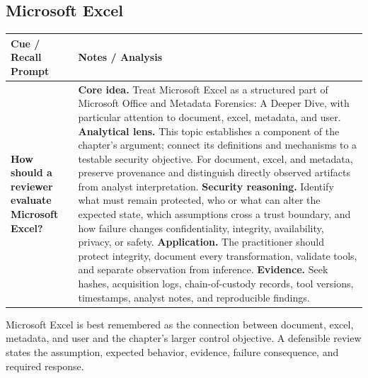 \documentclass[11pt]{article}
\newcommand{\CornellHeader}{%
\rowcolor{Navy}\color{white}\bfseries Cue / Recall Prompt & \color{white}\bfseries Notes / Analysis\\\hline}
\newcommand{\CornellRow}[2]{%
\cellcolor{CueGray}\RaggedRight\textbf{#1} & \RaggedRight #2\\\hline}
\begin{document}
\subsection*{Microsoft Excel}
\begin{longtable}{>{\RaggedRight\arraybackslash}p{}|>{\RaggedRight\arraybackslash}p{}}
\CornellHeader
\CornellRow{How should a reviewer evaluate Microsoft Excel?}{\textbf{Core idea.} Treat Microsoft Excel as a structured part of Microsoft Office and Metadata Forensics: A Deeper Dive, with particular attention to document, excel, metadata, and user. \textbf{Analytical lens.} This topic establishes a component of the chapter's argument; connect its definitions and mechanisms to a testable security objective. For document, excel, and metadata, preserve provenance and distinguish directly observed artifacts from analyst interpretation. \textbf{Security reasoning.} Identify what must remain protected, who or what can alter the expected state, which assumptions cross a trust boundary, and how failure changes confidentiality, integrity, availability, privacy, or safety. \textbf{Application.} The practitioner should protect integrity, document every transformation, validate tools, and separate observation from inference. \textbf{Evidence.} Seek hashes, acquisition logs, chain-of-custody records, tool versions, timestamps, analyst notes, and reproducible findings.}
\end{longtable}
\begin{topicsummary}
Microsoft Excel is best remembered as the connection between document, excel, metadata, and user and the chapter's larger control objective. A defensible review states the assumption, expected behavior, evidence, failure consequence, and required response.
\end{topicsummary}
\end{document}
